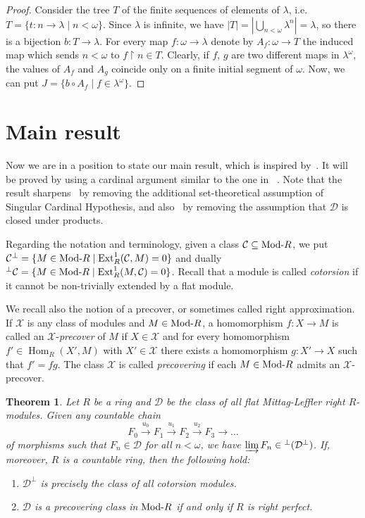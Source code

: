 \documentclass[a4paper,11pt]{amsart}
\renewcommand{\iff}{if and only if }
\newcommand{\st}{such that }
\newcommand{\la}{\longrightarrow}
\newcommand{\li}{\varinjlim}
\DeclareMathOperator{\Hom}{Hom}
\DeclareMathOperator{\Ext}{Ext}
\newcommand{\Mod}[1]{\hbox{\rm Mod-}{#1}}
\newcommand{\C}{\mathcal{C}}
\newcommand{\D}{\mathcal{D}}
\newcommand{\X}{\mathcal{X}}
\newcommand{\card}[1]{\left\lvert{#1}\right\rvert}
\theoremstyle{plain}
\newtheorem{thm}{Theorem}%
\theoremstyle{definition}
\theoremstyle{remark}
\begin{document}
\begin{proof}
Consider the tree $T$ of the finite sequences of elements of $\lambda$, i.e. $T = \{t: n \to \lambda \mid n<\omega\}$. Since $\lambda$ is infinite, we have $\card{T} = \card{\bigcup_{n<\omega} \lambda^n} = \lambda$, so there is a bijection $b: T \to \lambda$. For every map $f: \omega \to \lambda$ denote by $A_f: \omega \to T$ the induced map which sends $n<\omega$ to $f\restriction n \in T$. Clearly, if $f$, $g$ are two different maps in $\lambda^\omega$, the values of 
$A_f$ and $A_g$ coincide only on a finite initial segment of $\omega$. Now, we can put $J = \{ b\circ A_f \mid f \in \lambda^\omega \}$.
\end{proof}



\section{Main result}

Now we are in a position to state our main result, which is inspired by~\cite[\S5]{HT}. It will be proved by using a cardinal argument similar to the one in ~\cite[Proposition 2.5]{Ba}. Note that the result sharpens~\cite[Theorem 2.9]{SarT} by removing the additional set-theoretical assumption of Singular Cardinal Hypothesis, and also~\cite[Corollaries 7.6 and 7.7]{HT} by removing the assumption that $\D$ is closed under products.

Regarding the notation and terminology, given a class $\C \subseteq \Mod{R}$, we put $\C^\perp = \{ M \in \Mod{R} \mid \Ext^1_R(\C,M) = 0 \}$ and dually ${^\perp\C} = \{ M \in \Mod{R} \mid \Ext^1_R(M,\C) = 0 \}$. Recall that a module is called \emph{cotorsion} if it cannot be non-trivially extended by a flat module.

We recall also the notion of a precover, or sometimes called right approximation. If $\X$ is any class of modules and $M\in \Mod{R}$, a homomorphism $f\colon X \to M$ is called an $\X$-\emph{precover} of $M$ if $X \in \X$ and for every homomorphism $f '\in \Hom_R(X', M)$ with $X'\in\X$ there exists a homomorphism $g\colon X'\to X$ such that $f '= f g$. The class $\X$ is called \emph{precovering} if each $M \in \Mod{R}$ admits an $\X$-precover.

\begin{thm} \label{thm:double_perp_of_flat_ML}
Let $R$ be a ring and $\D$ be the class of all flat Mittag-Leffler right $R$-modules. Given any countable chain
%
$$ F_0 \overset{u_0}\la F_1 \overset{u_1}\la F_2 \overset{u_2}\la F_3 \la \dots $$
%
of morphisms \st $F_n \in \D$ for all $n<\omega$, we have $\li F_n \in {^\perp (\D^\perp)}$.
If, moreover, $R$ is a countable ring, then the following hold:
%
\begin{enumerate}
 \item $\D^\perp$ is precisely the class of all cotorsion modules.
 \item $\D$ is a precovering class in $\Mod{R}$ \iff $R$ is right perfect.
\end{enumerate}
\end{thm}
\end{document}
